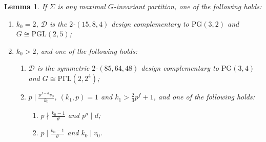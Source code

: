 \documentclass[a4paper,twopage,reqno,12pt]{amsart}
\newtheorem{lemma}[theorem]{Lemma}
\theoremstyle{definition}
\numberwithin{equation}{section}
\newcommand{\PGL}{\mathrm{PGL}}
\newcommand{\PGaL}{\mathrm{P\Gamma L}}
\newcommand{\PG}{\mathrm{PG}}
\begin{document}
\bigskip

\begin{lemma}
\label{Uredu}If $\Sigma $ is any maximal $G$-invariant partition, one of the following holds:
\begin{enumerate}
\item $k_{0}=2$, $\mathcal{D}$ is the $2$-$(15,8,4)$ design complementary to $\PG(3,2)$ and $ G \cong \PGL (2,5)$;
\item $k_{0}>2$, and one of the following holds:
\begin{enumerate}
    \item $\mathcal{D}$ is the symmetric $2$-$(85,64,48)$ design complementary to $\PG(3,4)$ and $G\cong \PGaL (2,2^4)$;
    \item $p\mid \frac{p^{f-a}v_{0}}{k_{0}}$, $%
    (k_{1},p)=1$ and $k_{1}>\frac{2}{3}p^{f}+1$, and one of the following holds:
    \begin{enumerate}
    \item[(i)] $p \nmid \frac{k_{0}-1}{\theta }$ and $p^{a}\mid d$;
    \item[(ii)] $p \mid \frac{k_{0}-1}{\theta }$ and $k_{0}\mid v_{0}$.
    \end{enumerate}
\end{enumerate}

\end{enumerate}
\end{lemma}
\end{document}
